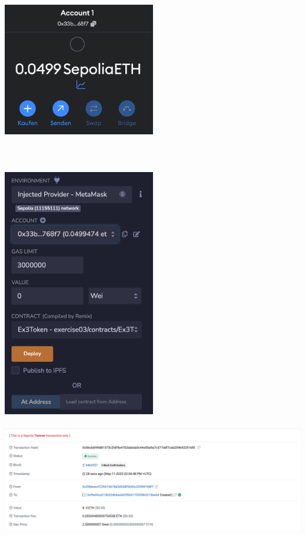 \documentclass[14pt,a4paper]{extarticle}
\begin{document}
	\includegraphics[width=0.5\textwidth]{images/metamask.png} \\ \\
	 \\ \\
	\includegraphics[width=0.5\textwidth]{images/deploy.png}
	\newpage
	 \\ \\
	\includegraphics[width=\textwidth]{images/deploy_tx.png} \\ \\
\end{document}
